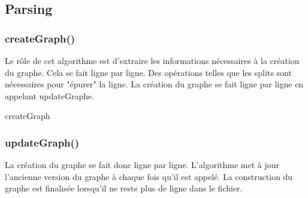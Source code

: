 \documentclass[a4paper]{article}
\makeatletter
\def\BState{\State\hskip-\ALG@thistlm}
\makeatother
\begin{document}
\subsection{Parsing}
\subsubsection{createGraph()}
Le rôle de cet algorithme est d'extraire les informations nécessaires à la création du graphe. Cela se fait ligne par ligne. Des opérations telles que les splits sont nécessaires pour "épurer" la ligne. La création du graphe se fait ligne par ligne en appelant updateGraphe.
\begin{algorithm}
\caption{createGraph}\label{createGraph()}
\end{algorithm}
\begin{figure}[H]
\end{figure}
\newpage
\subsubsection{updateGraph()}
La création du graphe se fait donc ligne par ligne. L'algorithme met à jour l'ancienne version du graphe à chaque fois qu'il est appelé. La construction du graphe est finalisée lorsqu'il ne reste plus de ligne dans le fichier.
\end{document}
